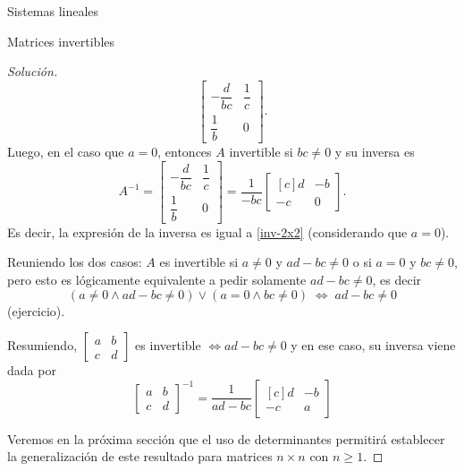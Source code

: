 \begin{chapter}{Sistemas lineales}
\begin{section}{Matrices invertibles}
\begin{proof}[Solución]
\begin{equation*}
                \begin{bmatrix}-\dfrac{d}{bc}&\dfrac{1}{c}\\[6pt]\dfrac{1}{b}&0\end{bmatrix}.
                \end{equation*}  
                Luego, en el caso  que $a=0$, entonces $A$ invertible si  $b c\not=0$ y su inversa es
                \begin{equation*}
                A^{-1} = \begin{bmatrix}-\dfrac{d}{bc}&\dfrac{1}{c}\\[6pt]\dfrac{1}{b}&0\end{bmatrix} = 
                \dfrac{1}{-bc}
                \begin{bmatrix*}[c]d&-b\\-c&0\end{bmatrix*}.
                \end{equation*}
                Es decir, la expresión de la inversa es igual a \eqref{inv-2x2} (considerando que  $a=0$).
                
                Reuniendo los dos casos:  $A$ es invertible si $a\not=0$ y  $ad-bc\not=0$ o si $a=0$ y $bc\not=0$, pero esto es lógicamente equivalente a pedir solamente  $ad-bc\not=0$, es decir
                \begin{equation*}
                (a\not=0 \wedge ad-bc\not=0) \vee (a=0 \wedge bc\not=0)\; \Leftrightarrow\; ad-bc\not=0
                \end{equation*}
                (ejercicio).
                
                Resumiendo, $\begin{bmatrix*} a&b\\c&d\end{bmatrix*}$ es invertible  $\Leftrightarrow ad-bc\not=0$  y en ese caso,  su inversa viene dada por 
                \begin{equation}
                \begin{bmatrix*} a&b\\c&d\end{bmatrix*}^{-1} =  \dfrac{1}{ad-bc}
                \begin{bmatrix*}[c]d&-b\\-c&a\end{bmatrix*}
                \end{equation} 

                Veremos en la próxima sección que el uso de determinantes permitirá establecer la generalización de este resultado para matrices $n \times n$ con $n\ge 1$.
                

\end{proof}
\end{section}
\end{chapter}
